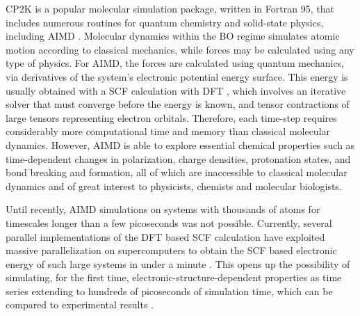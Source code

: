 CP2K \cite{hutter2014cp2k} is a popular molecular simulation package, written in Fortran 95, that includes numerous routines for quantum chemistry and solid-state physics, including \ac{AIMD} \cite{marx2009ab}.
Molecular dynamics within the \ac{BO} regime simulates atomic motion according to classical mechanics, while forces may be calculated using any type of physics.
For \ac{AIMD}, the forces are calculated using quantum mechanics, via derivatives of the system's electronic potential energy surface.
This energy is usually obtained with a \ac{SCF} calculation with \ac{DFT} \cite{vandevondele2012linear,hutter2014cp2k}, which involves an iterative solver that must converge before the energy is known, and tensor contractions of large tensors representing electron orbitals.
Therefore, each time-step requires considerably more computational time and memory than classical molecular dynamics.
However, \ac{AIMD} is able to explore essential chemical properties such as time-dependent changes in polarization, charge densities, protonation states, and bond breaking and formation, all of which are inaccessible to classical molecular dynamics and of great interest to physicists, chemists and molecular biologists.

Until recently, \ac{AIMD} simulations on systems with thousands of atoms for timescales longer than a few picoseconds was not possible.
Currently, several parallel implementations of the \ac{DFT} based \ac{SCF} calculation have exploited massive parallelization on supercomputers to obtain the \ac{SCF} based electronic energy of such large systems in under a minute \cite{vasp_bench,kresse1996efficient,cp2k_bench,vandevondele2012linear}.
This opens up the possibility of simulating, for the first time, electronic-structure-dependent properties as time series extending to hundreds of picoseconds of simulation time, which can be compared to experimental results \cite{gillan2016perspective, pestana2017ab, hassanali2013proton, milovanovic2018new, sellner2013charge}.

